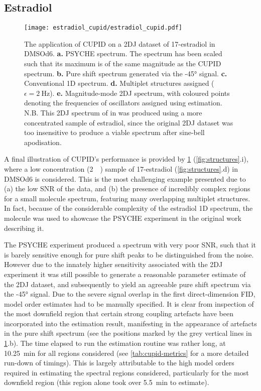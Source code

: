 \subsection{Estradiol}
\begin{figure}
    \texttt{[image: estradiol\_cupid/estradiol\_cupid.pdf]}%
    \caption[
        The application of \acs{CUPID} on a 17\textbeta-estradiol dataset.
    ]{
        The application of \acs{CUPID} on a \ac{2DJ} dataset of 17\textbeta-estradiol
        in \acs{DMSOd6}.
        \textbf{a.} \acs{PSYCHE} spectrum.
        The spectrum has been scaled such that its maximum is of the same
        magnitude as the \acs{CUPID} spectrum.
        \textbf{b.} Pure shift spectrum generated via the \ang{-45} signal.
        \textbf{c.} Conventional \ac{1D} spectrum.
        \textbf{d.} Multiplet structures assigned ($\epsilon =
        \qty{2}{\hertz}$).
        \textbf{e.} Magnitude-mode \ac{2DJ} spectrum, with coloured points
        denoting the frequencies of oscillators assigned using estimation.
        N.B. This \ac{2DJ} spectrum of in was produced using a more
        concentrated sample of estradiol, since the original \ac{2DJ} dataset
        was too insensitive to produce a viable spectrum after sine-bell
        apodisation.
    }
    \label{fig:estradiol-cupid}%
\end{figure}

A final illustration of \ac{CUPID}'s performance is provided by
\cref{fig:estradiol-cupid} (\cref{fig:structures}.i),
where a low concentration (\qty{2}{\milli\molar}) sample of
17\textbeta-estradiol (\cref{fig:structures}.d) in \acs{DMSOd6} is
considered. This is the most challenging example presented due
to (a) the low \ac{SNR} of the data, and (b) the presence of incredibly complex
regions for a small molecule spectrum, featuring many overlapping
multiplet structures. In fact, because of the considerable complexity
of the estradiol \ac{1D} spectrum, the molecule was used to showcase the
\ac{PSYCHE} experiment in the original work describing
it\cite{Foroozandeh2014}.

The \ac{PSYCHE} experiment produced a spectrum with very poor
\ac{SNR}, such that it is barely sensitive enough for pure shift peaks to be
distinguished from the noise. However due to the innately higher
sensitivity associated with the \ac{2DJ} experiment it was still possible to
generate a reasonable parameter estimate of the \ac{2DJ} dataset, and
subsequently to yield an agreeable pure shift spectrum via the \ang{-45}
signal. Due to the severe signal overlap in the first
direct-dimension \ac{FID}, model order estimates had to be
manually specified. It is clear from inspection of the most downfield region
that certain strong coupling artefacts have been incorporated into the
estimation result, manifesting in the appearance of artefacts in the pure shift
spectrum (see the positions marked by the grey vertical lines in
\cref{fig:estradiol-cupid}.b).
The time elapsed to run the estimation routine was rather
long, at \qty{10.25}{\minute} for all regions considered (see
\cref{tab:cupid-metrics} for a more detailed run-down of timings). This is
largely attributable to the high model orders required in estimating the
spectral regions considered, particularly for the most downfield region (this
region alone took over \qty{5.5}{\minute} to estimate).
